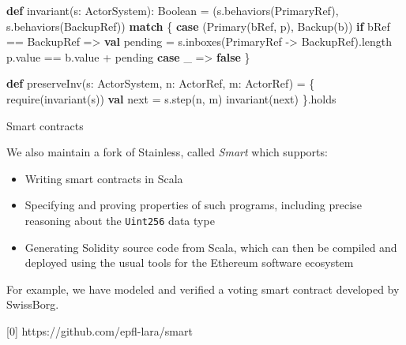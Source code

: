 \documentclass[
  ignorenonframetext,
]{beamer}
\newenvironment{Shaded}{}{}
\newcommand{\FunctionTok}[1]{\textcolor[rgb]{0.02,0.16,0.49}{#1}}
\newcommand{\KeywordTok}[1]{\textcolor[rgb]{0.00,0.44,0.13}{\textbf{#1}}}
\newcommand{\NormalTok}[1]{#1}
\providecommand{\tightlist}{%
  \setlength{\itemsep}{0pt}\setlength{\parskip}{0pt}}
\begin{document}
\begin{frame}[fragile]

\begin{Shaded}
\begin{Highlighting}[]
\KeywordTok{def} \FunctionTok{invariant}\NormalTok{(s: ActorSystem): Boolean =}
\NormalTok{  (s.}\FunctionTok{behaviors}\NormalTok{(PrimaryRef), s.}\FunctionTok{behaviors}\NormalTok{(BackupRef)) }\KeywordTok{match}\NormalTok{ \{}
    \KeywordTok{case}\NormalTok{ (}\FunctionTok{Primary}\NormalTok{(bRef, p), }\FunctionTok{Backup}\NormalTok{(b)) }\KeywordTok{if}\NormalTok{ bRef == BackupRef =>}
      \KeywordTok{val}\NormalTok{ pending = s.}\FunctionTok{inboxes}\NormalTok{(PrimaryRef -> BackupRef).}\FunctionTok{length}
\NormalTok{      p.}\FunctionTok{value}\NormalTok{ == b.}\FunctionTok{value}\NormalTok{ + pending}
    \KeywordTok{case}\NormalTok{ _ => }\KeywordTok{false}
\NormalTok{  \}}
\end{Highlighting}
\end{Shaded}

\end{frame}

\begin{frame}[fragile]

\begin{Shaded}
\begin{Highlighting}[]
\KeywordTok{def} \FunctionTok{preserveInv}\NormalTok{(s: ActorSystem, n: ActorRef, m: ActorRef) = \{}
  \FunctionTok{require}\NormalTok{(}\FunctionTok{invariant}\NormalTok{(s))}
  \KeywordTok{val}\NormalTok{ next = s.}\FunctionTok{step}\NormalTok{(n, m)}
  \FunctionTok{invariant}\NormalTok{(next)}
\NormalTok{\}.}\FunctionTok{holds}
\end{Highlighting}
\end{Shaded}

\end{frame}

\begin{frame}[fragile]{Smart contracts}
\protect\hypertarget{smart-contracts}{}

We also maintain a fork of Stainless, called \emph{Smart} which
supports:

\begin{itemize}
\tightlist
\item
  Writing smart contracts in Scala
\item
  Specifying and proving properties of such programs, including precise
  reasoning about the \texttt{Uint256} data type
\item
  Generating Solidity source code from Scala, which can then be compiled
  and deployed using the usual tools for the Ethereum software ecosystem
\end{itemize}

For example, we have modeled and verified a voting smart contract
developed by SwissBorg.

{[}0{]} https://github.com/epfl-lara/smart

\end{frame}
\end{document}
